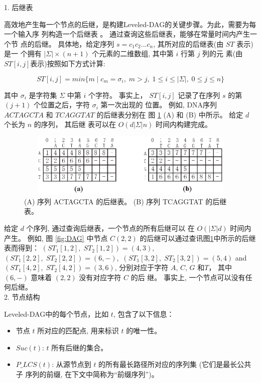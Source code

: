 1. 后继表

高效地产生每一个节点的后继，是构建Leveled-DAG的关键步骤。为此，需要为每一个输入序
列构造一个后继表 \cite{Chen2006}。 通过查询这些后继表，能够在常量时间内产生一个节
点的后继。 具体地，给定序列 $s=c_1c_2...c_n$, 其所对应的后继表(由 $ST$ 表示)是一
个拥有 $|\Sigma| \times (n+1)$ 个元素的二维数组, 其中第 $i$ 行第 $j$ 列的元
素(由$ST[i, j]$表示)按照如下方式计算:

$$ST[i,j]=min\{m\;|\;c_m=\sigma_i,\; m > j,\; 1 \leq i \leq
|\Sigma|,\; 0 \leq j \leq n\}$$

其中 $\sigma_i$ 是字符集 $\Sigma$ 中第 $i$ 个字符。 事实上， $ST[i,j]$
记录了在序列 $s$ 的第 $(j+1)$ 个位置之后，字符 $\sigma_i$ 第一次出现的
位置。 例如, DNA序列 $ACTAGCTA$ 和 $TCAGGTAT$ 的后继表分别在
图 \ref{fig:ST} (A) 和 (B) 中所示。 给定 $d$ 个长为 $n$ 的序列， 其后继
表可以在 $O(d|\Sigma|n)$ 时间内构建完成。

\begin{figure}[!h]
  \centering
  \includegraphics[height=1.2in, width=4.8in]{figures/4_MLCS/successor_table}
  \caption{(A) 序列 ACTAGCTA 的后继表。 (B) 序列 TCAGGTAT 的后继表。}
    \label{fig:ST}
  \end{figure}

  给定 $d$ 个序列, 通过查询后继表，一个节点的所有后继可以
  在 $O(|\Sigma|d)$ 时间内产生。 例如, 图 \ref{fig:DAG} 中节点 $C(2,
  2)$ 的后继可以通过查讯图\ref{fig:ST}中所示的后继表而得到：
  $(ST_1[1, 2],\;ST_2[1, 2]) = (4, 3)$,\,
  $(ST_1[2, 2],\;ST_2[2, 2]) = (6, -)$,\,
  $(ST_1[3, 2],\;ST_2[3, 2]) = (5, 4)$ and
  $(ST_1[4, 2],\;ST_2[4, 2]) = (3, 6)$, 分别对应于字符 $A$, $C$,
  $G$ 和$T$， 其中 $(6, -)$ 意味着 $(2, 2)$ 没有对应字符 $C$ 的后
  继。 事实上, 一个节点可以没有任何后继。\\

2. 节点结构
\label{sec:Node}

Leveled-DAG中的每个节点，比如 $t$, 包含了以下信息：

\begin{itemize}
\item 节点 $t$ 所对应的匹配点, 用来标识 $t$ 的唯一性。
\item $Suc(t)$: $t$ 所有后继的集合。
\item $P\_LCS(t)$: 从源节点到 $t$ 的所有最长路径所对应的序列集 (它们是最长公共子
  序列的前缀, 在下文中简称为“前缀序列”)。
\end{itemize}


